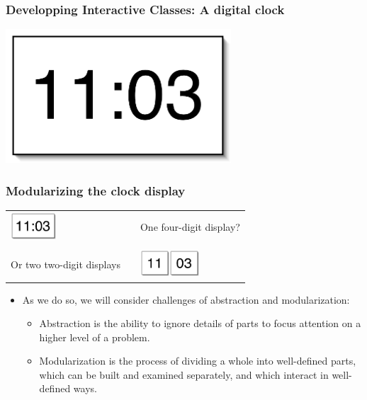 \documentclass{beamer}
\begin{document}
\begin{frame}
\frametitle{Developping Interactive Classes: A digital clock}
\begin{center}
\includegraphics[height=5cm,keepaspectratio]{./figures/clock}
\end{center}
\end{frame}

\begin{frame}
\frametitle{Modularizing the clock display}
\begin{tabular}{lll}
\begin{minipage}{3cm}
\includegraphics[height=1cm,keepaspectratio]{./figures/cl1} \end{minipage} & \mbox{}\hspace{1cm} & One four-digit display?\\
\mbox{}\\
\begin{minipage}{3cm}
Or two two-digit displays
\end{minipage}& & \begin{minipage}{3cm}\includegraphics[height=1cm,keepaspectratio]{./figures/cl2}\includegraphics[height=1cm,keepaspectratio]{./figures/cl3}\end{minipage}
\end{tabular}
\end{frame}


\begin{frame}

\begin{itemize}
\item As we do so, we will consider challenges of abstraction and modularization:

\begin{itemize}
\item Abstraction is the ability to ignore details of parts to focus attention on a higher level of a problem.
\item Modularization is the process of dividing a whole into well-defined parts, which can be built and examined
separately, and which interact in well-defined ways.
\end{itemize}
\end{itemize}

\end{frame}
\end{document}
